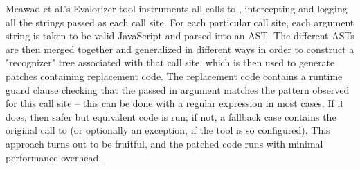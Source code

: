 Meawad et al.'s \cite{EvalBegone} Evalorizer tool instruments all calls to
, intercepting and logging all the strings passed as each call site.
For each particular call site, each argument string is taken to be valid
JavaScript and parsed into an AST. The different ASTs are then merged together
and generalized in different ways in order to construct a "recognizer" tree
associated with that call site, which is then used to generate patches
containing replacement code. The replacement code contains a runtime guard
clause checking that the passed in argument matches the pattern observed for
this call site -- this can be done with a regular expression in most cases. If
it does, then safer but equivalent code is run; if not, a fallback case
contains the original call to  (or optionally an exception, if the
tool is so configured). This approach turns out to be fruitful, and the patched
code runs with minimal performance overhead.
